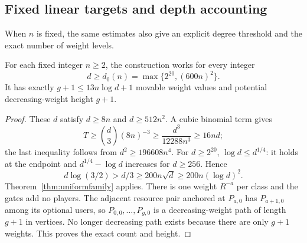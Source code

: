 \documentclass[manuscript,review,anonymous]{acmart}
\begin{document}
\subsection{Fixed linear targets and depth accounting}\label{app:fixedc}
When $n$ is fixed, the same estimates also give an explicit degree threshold and the exact number of weight levels.
\begin{corollary}\label{cor:fixedn}
For each fixed integer $n\ge2$, the construction works for every integer
\[
 d\ge d_0(n)=\max\{2^{20},(600n)^2\}.
\]
It has exactly $g+1\le13n\log d+1$ movable weight values and potential decreasing-weight height $g+1$.
\end{corollary}
\begin{proof}
These $d$ satisfy $d\ge8n$ and $d\ge512n^2$. A cubic binomial term gives
\[
 T\ge\binom d3(8n)^{-3}
 \ge\frac{d^3}{12288n^3}\ge16nd;
\]
the last inequality follows from $d^2\ge196608n^4$. For $d\ge2^{20}$, $\log d\le d^{1/4}$: it holds at the endpoint and $d^{1/4}-\log d$ increases for $d\ge256$. Hence
\[
 d\log(3/2)>d/3\ge200n\sqrt d
 \ge200n(\log d)^2.
\]
Theorem~\ref{thm:uniformfamily} applies. There is one weight $R^{-a}$ per class and the gates add no players. The adjacent resource pair anchored at $P_{a,0}$ has $P_{a+1,0}$ among its optional users, so $P_{0,0},\ldots,P_{g,0}$ is a decreasing-weight path of length $g+1$ in vertices. No longer decreasing path exists because there are only $g+1$ weights. This proves the exact count and height.
\end{proof}



\end{document}
